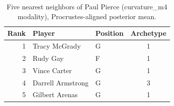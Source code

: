 \begin{table}[htbp]
  \centering\small
  \begin{tabular}{rllc}
    \toprule
    Rank & Player & Position & Archetype \\
    \midrule
    1 & Tracy McGrady & G & 1 \\
    2 & Rudy Gay & F & 1 \\
    3 & Vince Carter & G & 1 \\
    4 & Darrell Armstrong & G & 3 \\
    5 & Gilbert Arenas & G & 1 \\
    \bottomrule
  \end{tabular}
  \caption{Five nearest neighbors of Paul Pierce (curvature_m4 modality), Procrustes-aligned posterior mean.}
  \label{tab:Paul_Pierce_neighbors_curvature_m4}
\end{table}


